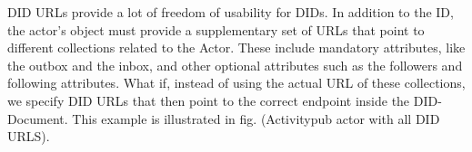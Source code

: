 
DID URLs provide a lot of freedom of usability for DIDs. In addition to the ID, the actor's object must provide a supplementary set of URLs that point to different collections related to the Actor. These include mandatory attributes, like the outbox and the inbox, and other optional attributes such as the followers and following attributes. What if, instead of using the actual URL of these collections, we specify DID URLs that then point to the correct endpoint inside the DID-Document. This example is illustrated in fig. (Activitypub actor with all DID URLS). 


